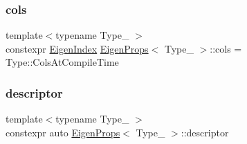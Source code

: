 \subsubsection{\texorpdfstring{cols}{cols}}
{\footnotesize\ttfamily template$<$typename Type\+\_\+ $>$ \\
constexpr \mbox{\hyperlink{eigen_8h_a4e595ab182718d84a409dd05e0829bdd}{Eigen\+Index}} \mbox{\hyperlink{struct_eigen_props}{Eigen\+Props}}$<$ Type\+\_\+ $>$\+::cols = Type\+::\+Cols\+At\+Compile\+Time\hspace{0.3cm}{\ttfamily [static]}}

\mbox{\label{struct_eigen_props_aa3861d665ff4bf5df6b531008fe358ef}} 
\subsubsection{\texorpdfstring{descriptor}{descriptor}}
{\footnotesize\ttfamily template$<$typename Type\+\_\+ $>$ \\
constexpr auto \mbox{\hyperlink{struct_eigen_props}{Eigen\+Props}}$<$ Type\+\_\+ $>$\+::descriptor\hspace{0.3cm}{\ttfamily [static]}}

